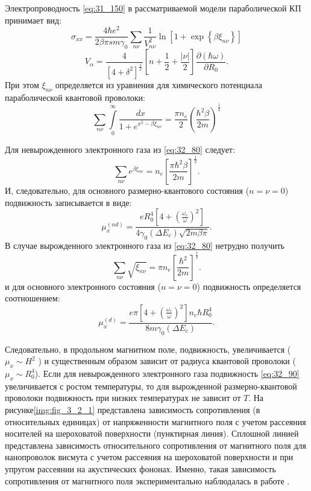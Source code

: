 Электропроводность \eqref{eq:31_150} в рассматриваемой модели параболической КП принимает вид:
\begin{equation} \label{eq:32_70}
\sigma _{xx} =\frac{4\hbar e^{2} }{2\beta \pi sm\gamma _{0} } \sum _{n\nu }\frac{1}{V_{n\nu }^{2} } \ln \left[1+\exp \left\{\beta \xi _{n\nu } \right\}\right]
\end{equation}
\[
V_{\alpha } =\frac{4}{\left[4+\delta ^{2} \right]^{\frac{1}{2} } } \left[n+\frac{1}{2} +\frac{\left|\nu \right|}{2} \right]\frac{\partial (\hbar \omega )}{\partial R_{0} } .
\] 
При этом $\xi _{n\nu }$ определяется из уравнения для химического потенциала параболической квантовой проволоки:
\begin{equation} \label{eq:32_80}
\sum_{n\nu} \int\limits_0^{\infty}\frac{dx}{1+e^{x^2 -\beta \xi_{n\nu } } } = \frac{\pi n_e }{2} \left(\frac{\hbar^2 \beta }{2m} \right)^{\frac{1}{2} } 
\end{equation}

Для невырожденного электронного газа из \eqref{eq:32_80} следует:
\[
\sum_{n\nu} e^{\beta \xi_{n\nu} }  =n_e \left[\frac{\pi \hbar^2 \beta}{2m} \right]^{\frac{1}{2}} .
\] 
И, следовательно, для основного размерно-квантового состояния ($n=\nu =0$) подвижность записывается в виде:
\begin{equation} \label{eq:32_90}
\mu_x^{\left(nd\right)} =\frac{eR_0^{4} \left[4+\left(\frac{\omega_c }{\omega } \right)^2 \right]}{4 \gamma_0 \left(\Delta E_c \right)\sqrt{2m\beta \pi } } . 
\end{equation}
В случае вырожденного электронного газа из \eqref{eq:32_80} нетрудно получить
\[
\sum_{n\nu }\sqrt{\xi_{n\nu } }  =\pi n_e \left[\frac{\hbar^2 }{2m} \right]^{\frac{1}{2} } .
\] 
и для основного электронного состояния ($n=\nu =0$) подвижность определяется соотношением:
\begin{equation} \label{eq:32_100}
\mu_x^{(d)} =\frac{e\pi \left[4+\left(\frac{\omega_c }{\omega } \right)^2 \right] n_e \hbar R_0^4 }{8m\gamma_0 \left(\Delta E_c \right)} .
\end{equation}
 
Следовательно, в продольном магнитном поле, подвижность, увеличивается ($\mu_x \sim H^2 $ ) и существенным образом зависит от радиуса квантовой проволоки ($\mu _{x} \sim R_0^4 $). Если для невырожденного электронного газа  подвижность \eqref{eq:32_90} увеличивается с ростом температуры, то для вырожденной размерно-квантовой проволоки подвижность при низких температурах не зависит от $T$. На рисунке\ref{img:fig_3_2_1} представлена зависимость сопротивления (в относительных единицах) от напряженности магнитного поля с учетом рассеяния носителей на шероховатой поверхности (пунктирная линия). Сплошной линией представлена зависимость относительного сопротивления от магнитного поля для нанопроволок висмута с учетом рассеяния на шероховатой поверхности и при упругом рассеянии на акустических фононах. Именно, такая зависимость сопротивления от магнитного поля экспериментально наблюдалась в работе \cite{Nikolaeva2004}.

